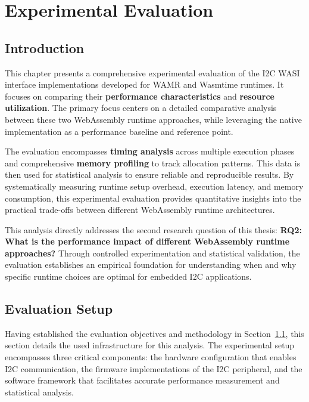 \chapter{Experimental Evaluation}
\label{chap:eval}

\section{Introduction}
\label{sec:eval-intro}

This chapter presents a comprehensive experimental evaluation of the I2C WASI interface implementations developed for WAMR and Wasmtime runtimes. It focuses on comparing their \textbf{performance characteristics} and \textbf{resource utilization}. The primary focus centers on a detailed comparative analysis between these two WebAssembly runtime approaches, while leveraging the native implementation as a performance baseline and reference point.

The evaluation encompasses \textbf{timing analysis} across multiple execution phases and comprehensive \textbf{memory profiling} to track allocation patterns. This data is then used for statistical analysis to ensure reliable and reproducible results. By systematically measuring runtime setup overhead, execution latency, and memory consumption, this experimental evaluation provides quantitative insights into the practical trade-offs between different WebAssembly runtime architectures.

This analysis directly addresses the second research question of this thesis: \textbf{RQ2: What is the performance impact of different WebAssembly runtime approaches?} Through controlled experimentation and statistical validation, the evaluation establishes an empirical foundation for understanding when and why specific runtime choices are optimal for embedded I2C applications.

\section{Evaluation Setup}
\label{sec:eval-methodology}

Having established the evaluation objectives and methodology in Section~\ref{sec:eval-intro}, this section details the used infrastructure for this analysis. The experimental setup encompasses three critical components: the hardware configuration that enables I2C communication, the firmware implementations of the I2C peripheral, and the software framework that facilitates accurate performance measurement and statistical analysis.

